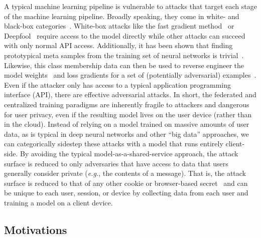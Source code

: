 \documentclass[conference]{IEEEtran}
\begin{document}
A typical machine learning pipeline is vulnerable to attacks that target each stage of the machine learning pipeline. Broadly speaking, they come in white- and black-box categories~\cite{meyers}. White-box attacks like the fast gradient method~\cite{fgm} or Deepfool~\cite{deepfool} require access to the model directly while other attacks can succeed with only normal API access. 
Additionally, it has been shown that finding prototypical meta samples from the training set of neural networks is trivial~\cite{chakraborty_adversarial_2018}. 
Likewise, this class membership data can then be used to reverse engineer the model weights~\cite{deepfool} and loss gradients for a set of (potentially adversarial) examples~\cite{hopskipjump}. 
Even if the attacker only has access to a typical application programming interface (API), there are effective adversarial attacks\cite{hopskipjump}. 
In short, the federated and centralized training paradigms are inherently fragile to attackers and dangerous for user privacy, even if the resulting model lives on the user device (rather than in the cloud). 
Instead of relying on a model trained on massive amounts of user data, as is typical in deep neural networks and other ``big data'' approaches, we can categorically sidestep these attacks with a model that runs entirely client-side. 
By avoiding the typical model-as-a-shared-service approach, the attack surface is reduced to only adversaries that have access to data that users generally consider private (\textit{e.g.}, the contents of a message). 
That is, the attack surface is reduced to that of any other cookie or browser-based secret~\cite{} and can be unique to each user, session, or device by collecting data from each user and training a model on a client device.



\subsection{Motivations} 
\end{document}
